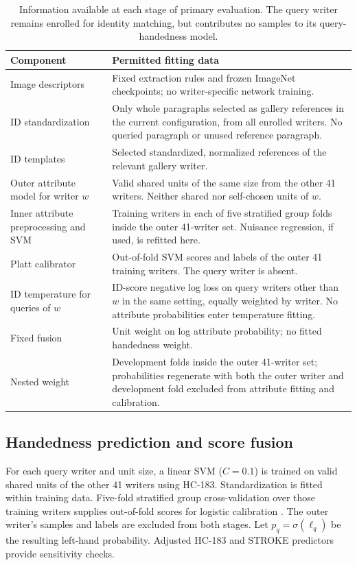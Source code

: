 \documentclass[ASNA,twocolumn]{USG}
\begin{document}
\begin{table}[!t]
\caption{Information available at each stage of primary evaluation. The query writer remains enrolled for identity matching, but contributes no samples to its query-handedness model.}\label{tab:mainnesting}
\centering\small
\begin{tabularx}{\textwidth}{p{}X}\toprule
Component & Permitted fitting data\\\midrule
Image descriptors & Fixed extraction rules and frozen ImageNet checkpoints; no writer-specific network training.\\
ID standardization & Only whole paragraphs selected as gallery references in the current configuration, from all enrolled writers. No queried paragraph or unused reference paragraph.\\
ID templates & Selected standardized, normalized references of the relevant gallery writer.\\
Outer attribute model for writer $w$ & Valid shared units of the same size from the other 41 writers. Neither shared nor self-chosen units of $w$.\\
Inner attribute preprocessing and SVM & Training writers in each of five stratified group folds inside the outer 41-writer set. Nuisance regression, if used, is refitted here.\\
Platt calibrator & Out-of-fold SVM scores and labels of the outer 41 training writers. The query writer is absent.\\
ID temperature for queries of $w$ & ID-score negative log loss on query writers other than $w$ in the same setting, equally weighted by writer. No attribute probabilities enter temperature fitting.\\
Fixed fusion & Unit weight on log attribute probability; no fitted handedness weight.\\
Nested weight & Development folds inside the outer 41-writer set; probabilities regenerate with both the outer writer and development fold excluded from attribute fitting and calibration.\\\bottomrule
\end{tabularx}
\end{table}

\subsection{Handedness prediction and score fusion}
For each query writer and unit size, a linear SVM ($C=0.1$) is trained on valid shared units of the other 41 writers using HC-183. Standardization is fitted within training data. Five-fold stratified group cross-validation over those training writers supplies out-of-fold scores for logistic calibration \cite{platt1999probabilistic}. The outer writer's samples and labels are excluded from both stages. Let $p_q=\sigma(\ell_q)$ be the resulting left-hand probability. Adjusted HC-183 and STROKE predictors provide sensitivity checks.
\end{document}
